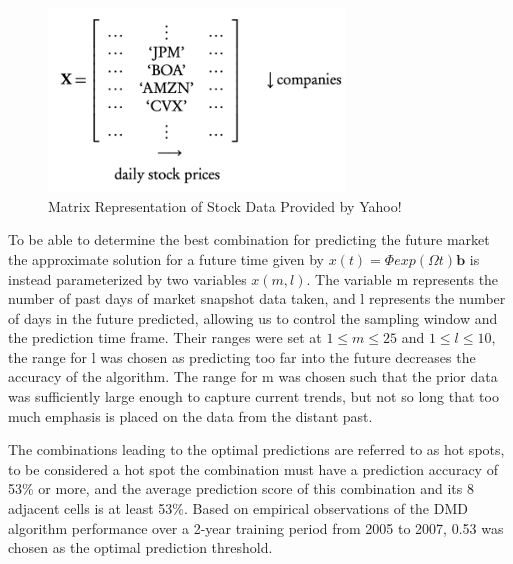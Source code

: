 \documentclass[12pt]{report}
\begin{document}
\begin{figure}[H]
    \centering
    \includegraphics[width=0.7\textwidth]{Application pics/MA680 DMD Financial Matrix X.png}
    \caption{Matrix Representation of Stock Data Provided by Yahoo!} \label{fig:FMatX}
\end{figure}
\noindent

To be able to determine the best combination for predicting the future market the approximate solution for a future time given by $x(t)={\Phi}exp(\Omega{t}){\textbf{b}}$ is instead parameterized by two variables $x(m,l)$. The variable m represents the number of past days of market snapshot data taken, and l represents the number of days in the future predicted, allowing us to control the sampling window and the prediction time frame. Their ranges were set at $1 \leq m \leq 25$ and $1 \leq l \leq 10$, the range for l was chosen as predicting too far into the future decreases the accuracy of the algorithm. The range for m was chosen such that the prior data was sufficiently large enough to capture current trends, but not so long that too much emphasis is placed on the data from the distant past. 

The combinations leading to the optimal predictions are referred to as hot spots, to be considered a hot spot the combination must have a prediction accuracy of 53$\%$ or more, and the average prediction score of this combination and its 8 adjacent cells is at least 53$\%$. Based on empirical observations of the DMD algorithm performance over a 2-year training period from 2005 to 2007, 0.53 was chosen as the optimal prediction threshold. 
\end{document}
